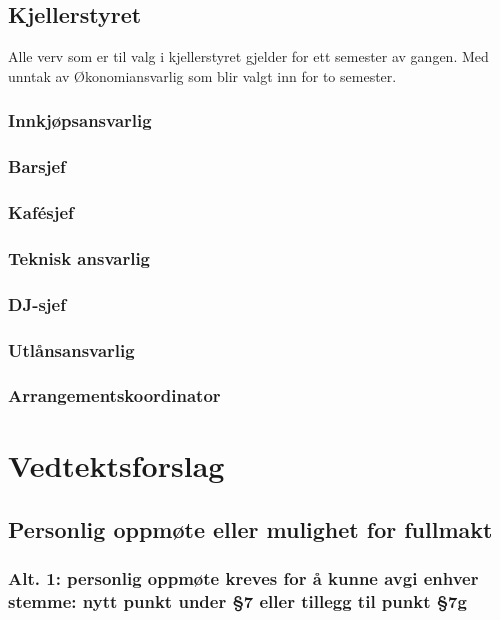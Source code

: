 \documentclass[10pt,norsk,a4paper]{article}
\begin{document}
\begin{minipage}[t]{0.49\textwidth}
\subsection{Kjellerstyret} %
Alle verv som er til valg i kjellerstyret gjelder for ett semester av gangen. Med unntak av Økonomiansvarlig som blir valgt inn for to semester.

\subsubsection{Innkjøpsansvarlig}
\subsubsection{Barsjef}
\subsubsection{Kafésjef}
\subsubsection{Teknisk ansvarlig}
\subsubsection{DJ-sjef}
\subsubsection{Utlånsansvarlig}
\subsubsection{Arrangementskoordinator}

\newpage

\section{Vedtektsforslag}

\subsection{Personlig oppmøte eller mulighet for fullmakt}
\subsubsection{Alt. 1: personlig oppmøte kreves for å kunne avgi enhver stemme:
               nytt punkt under §7 eller tillegg til punkt §7g}


\end{minipage}
\end{document}
